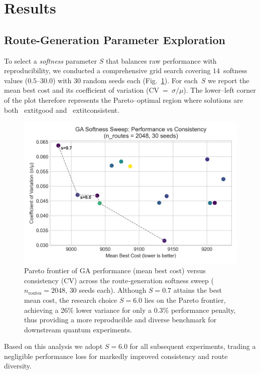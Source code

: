 \section{Results}
\label{sec:results}

\subsection{Route-Generation Parameter Exploration}

To select a \emph{softness} parameter $S$ that balances raw performance with
reproducibility, we conducted a comprehensive grid search covering
$14$~softness values ($0.5$--$30.0$) with $30$ random seeds each
(Fig.~\ref{fig:softness_pareto}).  For each~$S$ we report the mean best cost
and its coefficient of variation (CV~=~$\sigma/\mu$).  The lower--left
corner of the plot therefore represents the Pareto--optimal region where
solutions are both \	extit{good} and \	extit{consistent}.

\begin{figure}[htb]
    \centering
    \includegraphics[width=0.7\linewidth]{figures/00_softness_pareto.png}
    \caption{Pareto frontier of GA performance (mean best cost) versus consistency
    (CV) across the route‐generation softness sweep ($n_{\text{routes}}=2048$,
    $30$ seeds each).  Although $S=0.7$ attains the best mean cost, the
    research choice $S=6.0$ lies on the Pareto frontier, achieving a 26\%
    lower variance for only a 0.3\% performance penalty, thus providing a more
    reproducible and diverse benchmark for downstream quantum experiments.}
    \label{fig:softness_pareto}
\end{figure}

Based on this analysis we adopt $S=6.0$ for all subsequent experiments,
trading a negligible performance loss for markedly improved consistency and
route diversity.


